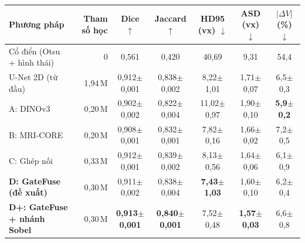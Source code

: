 \begin{tabular}{lrccccc}
\toprule
Phương pháp & Tham số học & Dice $\uparrow$ & Jaccard $\uparrow$ & HD95 (vx) $\downarrow$ & ASD (vx) $\downarrow$ & $|\Delta V|$ (\%) $\downarrow$\\
\midrule
Cổ điển (Otsu + hình thái) & 0 & 0{,}561 & 0{,}420 & 40{,}69 & 9{,}31 & 54{,}4\\
U-Net 2D (từ đầu) & 1{,}94\,M & 0{,}912{\scriptsize$\pm$0{,}001} & 0{,}838{\scriptsize$\pm$0{,}002} & 8{,}22{\scriptsize$\pm$1{,}01} & 1{,}71{\scriptsize$\pm$0{,}07} & 6{,}5{\scriptsize$\pm$0{,}3}\\
A: DINOv3 & 0{,}20\,M & 0{,}902{\scriptsize$\pm$0{,}002} & 0{,}822{\scriptsize$\pm$0{,}004} & 11{,}02{\scriptsize$\pm$0{,}97} & 1{,}90{\scriptsize$\pm$0{,}10} & \textbf{5{,}9{\scriptsize$\pm$0{,}2}}\\
B: MRI-CORE & 0{,}20\,M & 0{,}908{\scriptsize$\pm$0{,}001} & 0{,}832{\scriptsize$\pm$0{,}001} & 7{,}82{\scriptsize$\pm$0{,}16} & 1{,}66{\scriptsize$\pm$0{,}02} & 7{,}2{\scriptsize$\pm$0{,}5}\\
C: Ghép nối & 0{,}33\,M & 0{,}912{\scriptsize$\pm$0{,}001} & 0{,}839{\scriptsize$\pm$0{,}002} & 8{,}13{\scriptsize$\pm$0{,}56} & 1{,}64{\scriptsize$\pm$0{,}06} & 6{,}1{\scriptsize$\pm$0{,}9}\\
\textbf{D: GateFuse (đề xuất)} & 0{,}30\,M & 0{,}911{\scriptsize$\pm$0{,}002} & 0{,}838{\scriptsize$\pm$0{,}004} & \textbf{7{,}43{\scriptsize$\pm$1{,}03}} & 1{,}60{\scriptsize$\pm$0{,}10} & 6{,}2{\scriptsize$\pm$0{,}4}\\
\textbf{D+: GateFuse + nhánh Sobel} & 0{,}30\,M & \textbf{0{,}913{\scriptsize$\pm$0{,}001}} & \textbf{0{,}840{\scriptsize$\pm$0{,}001}} & 7{,}52{\scriptsize$\pm$0{,}48} & \textbf{1{,}57{\scriptsize$\pm$0{,}03}} & 6{,}6{\scriptsize$\pm$0{,}8}\\
\bottomrule
\end{tabular}
